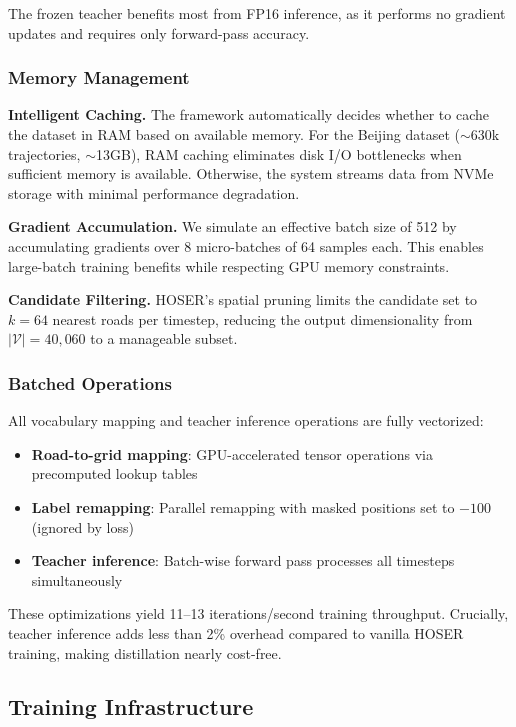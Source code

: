 The frozen teacher benefits most from FP16 inference, as it performs no gradient updates and requires only forward-pass accuracy.

\subsubsection{Memory Management}

\textbf{Intelligent Caching.} The framework automatically decides whether to cache the dataset in RAM based on available memory. For the Beijing dataset ($\sim$630k trajectories, $\sim$13GB), RAM caching eliminates disk I/O bottlenecks when sufficient memory is available. Otherwise, the system streams data from NVMe storage with minimal performance degradation.

\textbf{Gradient Accumulation.} We simulate an effective batch size of 512 by accumulating gradients over 8 micro-batches of 64 samples each. This enables large-batch training benefits while respecting GPU memory constraints.

\textbf{Candidate Filtering.} HOSER's spatial pruning limits the candidate set to $k = 64$ nearest roads per timestep, reducing the output dimensionality from $|\mathcal{V}| = 40{,}060$ to a manageable subset.

\subsubsection{Batched Operations}

All vocabulary mapping and teacher inference operations are fully vectorized:

\begin{itemize}[noitemsep,topsep=0pt]
\item \textbf{Road-to-grid mapping}: GPU-accelerated tensor operations via precomputed lookup tables
\item \textbf{Label remapping}: Parallel remapping with masked positions set to $-100$ (ignored by loss)
\item \textbf{Teacher inference}: Batch-wise forward pass processes all timesteps simultaneously
\end{itemize}

These optimizations yield 11--13 iterations/second training throughput. Crucially, teacher inference adds less than 2\% overhead compared to vanilla HOSER training, making distillation nearly cost-free.

\subsection{Training Infrastructure}
\label{sec:impl-infra}


